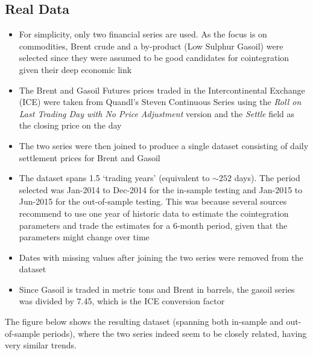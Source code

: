 \documentclass[11pt]{article}
\providecommand{\tightlist}{%
      \setlength{\itemsep}{0pt}\setlength{\parskip}{0pt}}
\begin{document}
    \subsection{Real Data}\label{real-data}
    
    
    \begin{itemize}
\tightlist
\item
  For simplicity, only two financial series are used. As the focus is on  commodities, Brent crude and a
  by-product (Low Sulphur Gasoil) were selected since they were assumed
  to be good candidates for cointegration given their deep economic link
\item
  The
  Brent \cite{Brent}
  and
  Gasoil \cite{Gasoil}
  Futures prices traded in the Intercontinental Exchange (ICE) were
  taken from
  Quandl's  Steven Continuous Series \cite{Quandl'sStevenContinuousSeries} using the {\em Roll on Last Trading Day with No
  Price Adjustment} version and the {\em Settle} field as the closing price on the day
\item
  The two series were then joined to produce a single dataset consisting of
  daily settlement prices for Brent and Gasoil
\item
  The dataset spans 1.5 `trading years' (equivalent to $\sim 252$ days). The period selected was
  Jan-2014 to Dec-2014 for the in-sample testing and Jan-2015 to
  Jun-2015 for the out-of-sample testing. This was because several
  sources recommend to use one year of historic data to estimate the
  cointegration parameters and trade the estimates for a 6-month period,
  given that the parameters might change over time
\item
  Dates with missing values after joining the two series were removed from the dataset
\item
  Since Gasoil is traded in metric tons and Brent in barrels, the gasoil
  series was divided by 7.45, which is the
  ICE  conversion factor \cite{ICEconversionfactor}
\end{itemize}
The figure below shows the resulting dataset (spanning both in-sample
and out-of-sample periods), where the two series indeed seem to be
closely related, having very similar trends.
    \begin{center}
    \end{center}
    { \hspace*{\fill} \\}
    
\end{document}
